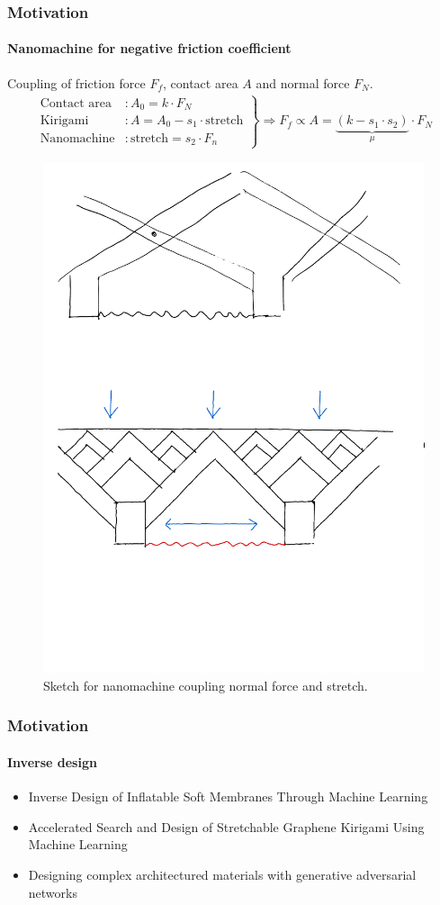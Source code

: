 \documentclass[
	10pt, %
]{beamer}
\begin{document}
\begin{frame}
	\frametitle{Motivation}
	\framesubtitle{Nanomachine for negative friction coefficient}

	Coupling of friction force $F_f$, contact area $A$ and normal force $F_N$.
	\begin{align*}
		\left.\begin{aligned}
			\text{Contact area} &: A_0 = k \cdot F_N \\
			\text{Kirigami} &: A = A_0 - s_1 \cdot \text{stretch} \\
			\text{Nanomachine}&: \text{stretch} = s_2 \cdot F_n
		  \end{aligned}\right\} \Longrightarrow F_f \propto A = \underbrace{(k - s_1 \cdot s_2)}_{\mu} \cdot F_N
	\end{align*}
	
	\begin{figure}
		\includegraphics[width=0.6\linewidth]{figures/nanomachine.pdf}
		\caption{Sketch for nanomachine coupling normal force and stretch.}
	\end{figure}	

	
\end{frame}

\begin{frame}
	\frametitle{Motivation}
	\framesubtitle{Inverse design}
	\begin{itemize}
		\item Inverse Design of Inflatable Soft Membranes Through Machine Learning
		\item Accelerated Search and Design of Stretchable Graphene Kirigami Using Machine Learning
		\item Designing complex architectured materials with generative adversarial networks
	\end{itemize}

	
\end{frame}
\end{document}
